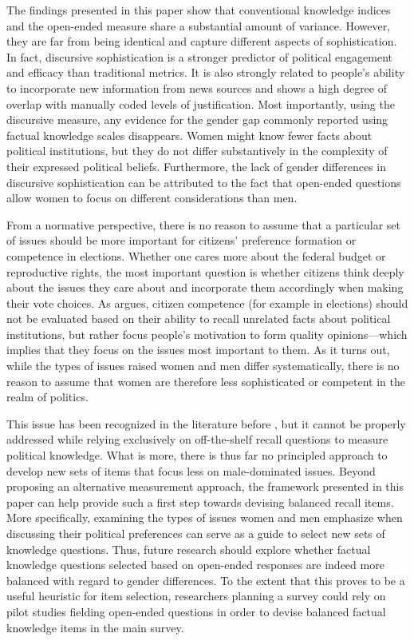 The findings presented in this paper show that conventional knowledge indices and the open-ended measure share a substantial amount of variance. However, they are far from being identical and capture different aspects of sophistication. In fact, discursive sophistication is a stronger predictor of political engagement and efficacy than traditional metrics. It is also strongly related to people's ability to incorporate new information from news sources and shows a high degree of overlap with manually coded levels of justification. Most importantly, using the discursive measure, any evidence for the gender gap commonly reported using factual knowledge scales disappears. Women might know fewer facts about political institutions, but they do not differ substantively in the complexity of their expressed political beliefs. Furthermore, the lack of gender differences in discursive sophistication can be attributed to the fact that open-ended questions allow women to focus on different considerations than men.

From a normative perspective, there is no reason to assume that a particular set of issues should be more important for citizens' preference formation or competence in elections. Whether one cares more about the federal budget or reproductive rights, the most important question is whether citizens think deeply about the issues they care about and incorporate them accordingly when making their vote choices. As \citet{druckman2014pathologies} argues, citizen competence (for example in elections) should not be evaluated based on their ability to recall unrelated facts about political institutions, but rather focus people's motivation to form quality opinions---which implies that they focus on the issues most important to them. As it turns out, while the types of issues raised women and men differ systematically, there is no reason to assume that women are therefore less sophisticated or competent in the realm of politics.

This issue has been recognized in the literature before \citep[e.g.,][]{graber2001processing,dolan2011women}, but it cannot be properly addressed while relying exclusively on off-the-shelf recall questions to measure political knowledge. What is more, there is thus far no principled approach to develop new sets of items that focus less on male-dominated issues. Beyond proposing an alternative measurement approach, the framework presented in this paper can help provide such a first step towards devising balanced recall items. More specifically, examining the types of issues women and men emphasize when discussing their political preferences can serve as a guide to select new sets of knowledge questions. Thus, future research should explore whether factual knowledge questions selected based on open-ended responses are indeed more balanced with regard to gender differences. To the extent that this proves to be a useful heuristic for item selection, researchers planning a survey could rely on pilot studies fielding open-ended questions in order to devise balanced factual knowledge items in the main survey.

